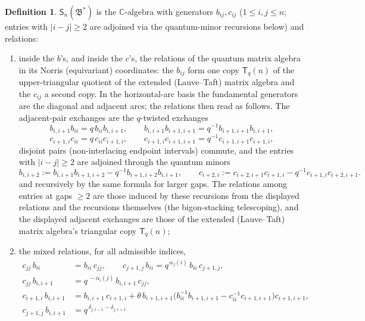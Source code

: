 \documentclass[11pt]{article}
\theoremstyle{definition}
\newtheorem{definition}[theorem]{Definition}
\theoremstyle{remark}
\newcommand{\C}{\mathbb{C}}
\newcommand{\B}{\mathfrak{B}}
\newcommand{\Sn}{\mathsf{S}_n}
\newcommand{\tht}{\theta}
\newcommand{\coloneqq}{\mathrel{:=}}
\begin{document}
\begin{definition}\label{def:A}
$\Sn(\B^*)$ is the $\C$-algebra with generators $b_{ij},c_{ij}$
($1\le i,j\le n$; entries with $|i-j|\ge2$ are adjoined via the
quantum-minor recursions below) and relations:
\begin{enumerate}[label=(\Alph*),leftmargin=2.2em]
\item\label{relAA} inside the $b$'s, and inside the $c$'s, the
  relations of the quantum matrix algebra in its Norris (equivariant)
  coordinates: the $b_{ij}$ form one copy $\mathsf T_q(n)$ of the
  upper-triangular quotient of the extended (Lauve--Taft) matrix
  algebra and the $c_{ij}$ a second copy.
  In the horizontal-arc basis the fundamental generators are the
  diagonal and adjacent arcs; the relations then read as follows.
  The adjacent-pair exchanges are the $q$-twisted exchanges
  \[
  b_{i,i+1}b_{ii}=q\,b_{ii}b_{i,i+1},\qquad
  b_{i,i+1}b_{i+1,i+1}=q^{-1}b_{i+1,i+1}b_{i,i+1},
  \]
  \[
  c_{i+1,i}c_{ii}=q\,c_{ii}c_{i+1,i},\qquad
  c_{i+1,i}c_{i+1,i+1}=q^{-1}c_{i+1,i+1}c_{i+1,i},
  \]
  disjoint pairs (non-interlacing endpoint intervals) commute, and
  the entries with $|i-j|\ge2$ are adjoined through the quantum
  minors
  \begin{equation}
  b_{i,i+2}\coloneqq b_{i,i+1}b_{i+1,i+2}-q^{-1}b_{i+1,i+2}b_{i,i+1},
  \qquad
  c_{i+2,i}\coloneqq c_{i+2,i+1}c_{i+1,i}-q^{-1}c_{i+1,i}c_{i+2,i+1}.
  \label{qmin}\tag{q-min}
  \end{equation}
  and recursively by the same formula for larger gaps.  The
  relations among entries at gaps $\ge2$ are those induced by these
  recursions from the displayed relations and the recursions
  themselves (the bigon-stacking telescoping), and the displayed
  adjacent exchanges are those of the extended (Lauve--Taft) matrix
  algebra's triangular copy $\mathsf T_q(n)$;
\item\label{relB} the mixed relations, for all admissible indices,
  \begin{align}
  c_{jj}\,b_{ii}&=b_{ii}\,c_{jj},
  \qquad
  c_{j+1,j}\,b_{ii}=q^{\,\alpha_j(i)}\,b_{ii}\,c_{j+1,j},
  \label{M0}\tag{M0}\\
  c_{jj}\,b_{i,i+1}&=q^{\,-\alpha_i(j)}\,b_{i,i+1}\,c_{jj},
  \label{M1}\tag{M1}\\
  c_{i+1,i}\,b_{i,i+1}&=b_{i,i+1}\,c_{i+1,i}
  +\tht\,b_{i+1,i+1}\bigl(b_{ii}^{-1}b_{i+1,i+1}
      -c_{ii}^{-1}c_{i+1,i+1}\bigr)c_{i+1,i+1},
  \label{M2}\tag{M2}\\
  c_{j+1,j}\,b_{i,i+1}&=q^{\,\delta_{j,i-1}-\delta_{j,i+1}}\,

\end{align}
\end{enumerate}
\end{definition}
\end{document}
